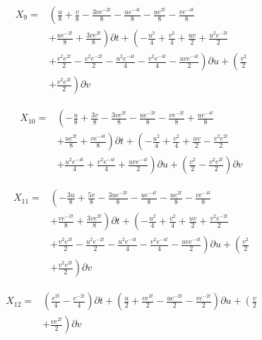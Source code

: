 \begin{align*}
X_{9}=&\left(\frac{u}{8}+\frac{v}{8}- \frac{3 v e^{- 2 t}}{8}- \frac{u e^{- 4 t}}{8}- \frac{u e^{2 t}}{8}- \frac{v e^{- 4 t}}{8}\right.\\
&+\left.\frac{u e^{- 2 t}}{8}+\frac{3 v e^{2 t}}{8} \right)\partial t+\left(- \frac{u^{2}}{4}+\frac{v^{2}}{4}+\frac{u v}{2}+\frac{u^{2} e^{- 2 t}}{2}\right.\\
&+\left.\frac{v^{2} e^{2 t}}{2}- \frac{v^{2} e^{- 2 t}}{2}- \frac{u^{2} e^{- 4 t}}{4}- \frac{v^{2} e^{- 4 t}}{4}- \frac{u v e^{- 4 t}}{2} \right)\partial u+\left(\frac{v^{2}}{2}\right.\\
&+\left.\frac{v^{2} e^{2 t}}{2} \right)\partial v
\end{align*}

\begin{align*}
X_{10}=&\left(- \frac{u}{8}+\frac{3 v}{8}- \frac{3 v e^{2 t}}{8}- \frac{u e^{- 2 t}}{8}- \frac{v e^{- 2 t}}{8}+\frac{u e^{- 4 t}}{8}\right.\\
&+\left.\frac{u e^{2 t}}{8}+\frac{v e^{- 4 t}}{8} \right)\partial t+\left(- \frac{u^{2}}{4}+\frac{v^{2}}{4}+\frac{u v}{2}- \frac{v^{2} e^{2 t}}{2}\right.\\
&+\left.\frac{u^{2} e^{- 4 t}}{4}+\frac{v^{2} e^{- 4 t}}{4}+\frac{u v e^{- 4 t}}{2} \right)\partial u+\left(\frac{v^{2}}{2}- \frac{v^{2} e^{2 t}}{2} \right)\partial v
\end{align*}

\begin{align*}
X_{11}=&\left(- \frac{3 u}{8}+\frac{5 v}{8}- \frac{3 u e^{- 2 t}}{8}- \frac{u e^{- 4 t}}{8}- \frac{u e^{2 t}}{8}- \frac{v e^{- 4 t}}{8}\right.\\
&+\left.\frac{v e^{- 2 t}}{8}+\frac{3 v e^{2 t}}{8} \right)\partial t+\left(- \frac{u^{2}}{4}+\frac{v^{2}}{4}+\frac{u v}{2}+\frac{v^{2} e^{- 2 t}}{2}\right.\\
&+\left.\frac{v^{2} e^{2 t}}{2}- \frac{u^{2} e^{- 2 t}}{2}- \frac{u^{2} e^{- 4 t}}{4}- \frac{v^{2} e^{- 4 t}}{4}- \frac{u v e^{- 4 t}}{2} \right)\partial u+\left(\frac{v^{2}}{2}\right.\\
&+\left.\frac{v^{2} e^{2 t}}{2} \right)\partial v
\end{align*}

\begin{align*}
X_{12}=&\left(\frac{e^{2 t}}{4} - \frac{e^{- 2 t}}{4} \right)\partial t+\left(\frac{u}{2}+\frac{v e^{2 t}}{2}- \frac{u e^{- 2 t}}{2}- \frac{v e^{- 2 t}}{2} \right)\partial u+\left(\frac{v}{2}\right.\\
&+\left.\frac{v e^{2 t}}{2} \right)\partial v
\end{align*}

